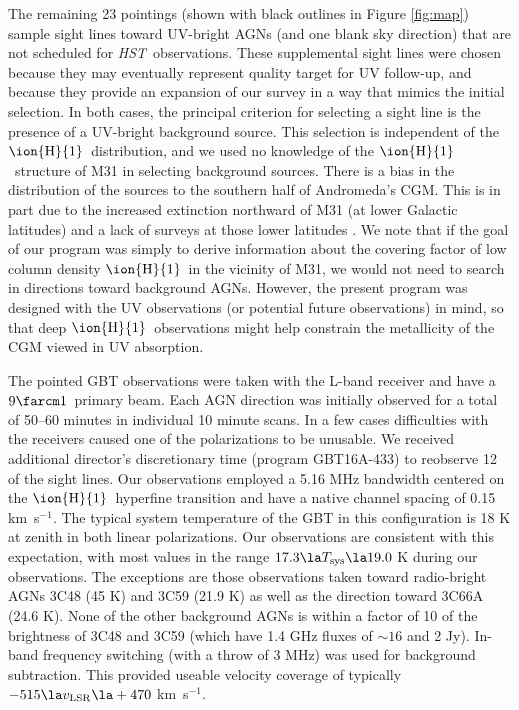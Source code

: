 \documentclass[12pt,preprint]{aastex6}
\newcommand{\beamsize}{\ensuremath{9\farcm1}}
\newcommand{\HI}{\ensuremath{\mbox{\ion{H}{1}}}}
\newcommand{\kms}{km~s$^{-1}$}
\newcommand{\hst}{{\em HST}}
\newcommand{\vlsr}{\ensuremath{v_{\rm LSR}\relax}}
\begin{document}
The remaining 23 pointings (shown with black outlines in Figure
\ref{fig:map}) sample sight lines toward UV-bright AGNs (and one blank
sky direction) that are not scheduled for \hst\ observations. These
supplemental sight lines were chosen because they may eventually
represent quality target for UV follow-up, and because they provide an
expansion of our survey in a way that mimics the initial selection. In
both cases, the principal criterion for selecting a sight line is the
presence of a UV-bright background source. This selection is
independent of the \HI\ distribution, and we used no knowledge of the
\HI\ structure of M31 in selecting background sources. There is a bias
in the distribution of the sources to the southern half of Andromeda's
CGM. This is in part due to the increased extinction northward of M31
(at lower Galactic latitudes) and a lack of surveys at those lower
latitudes \citep[a result being rectified by QSO searches with, e.g.,
LAMOST; ][]{huo2013}. We note that if the goal of our program was simply
to derive information about the covering factor of low column density
\HI\ in the vicinity of M31, we would not need to search in directions
toward background AGNs. However, the present program was designed with
the UV observations (or potential future observations) in mind, so
that deep \HI\ observations might help constrain the metallicity of
the CGM viewed in UV absorption.

The pointed GBT observations were taken with the L-band receiver and
have a \beamsize\ primary beam. Each AGN direction was initially
observed for a total of 50--60 minutes in individual 10 minute
scans. In a few cases difficulties with the receivers caused one of
the polarizations to be unusable. We received additional director's
discretionary time (program GBT16A-433) to reobserve 12 of the sight
lines.  Our observations employed a 5.16 MHz bandwidth centered on the
\HI\ hyperfine transition and have a native channel spacing of 0.15
\kms . The typical system temperature of the GBT in this configuration
is 18 K at zenith in both linear polarizations. Our observations are
consistent with this expectation, with most values in the range
$17.3 \la T_{\rm sys} \la 19.0$ K during our observations. The
exceptions are those observations taken toward radio-bright AGNs 3C48
(45 K) and 3C59 (21.9 K) as well as the direction toward 3C66A (24.6
K). None of the other background AGNs is within a factor of 10 of the
brightness of 3C48 and 3C59 (which have 1.4 GHz fluxes of $\sim 16$
and 2 Jy). In-band frequency switching (with a throw of 3 MHz) was
used for background subtraction. This provided useable velocity
coverage of typically $-515 \la \vlsr \la +470$ \kms.
\end{document}
